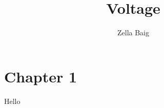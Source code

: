 \documentclass[a4paper,openany,nobib]{tufte-book}
\title{Voltage}
\author{Zella Baig}
\begin{document}
\frontmatter
{\maketitle}
\tableofcontents
\thispagestyle{empty}
\mainmatter
\chapter{Chapter 1}
Hello
\setcounter{page}{1}
\nocite{*}
\printbibliography
\end{document}
